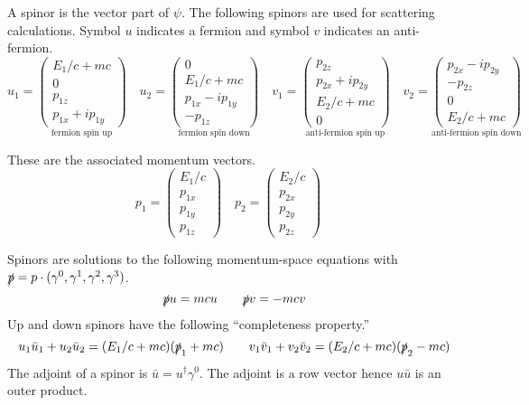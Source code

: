 \documentclass[12pt]{article}
\begin{document}
\noindent
A spinor is the vector part of $\psi$.
The following spinors are used for scattering calculations.
Symbol $u$ indicates a fermion and symbol $v$ indicates an anti-fermion.
\begin{equation*}
u_1=\underset{\text{fermion spin up}}{\begin{pmatrix}E_1/c+mc\\0\\p_{1z}\\p_{1x}+ip_{1y}\end{pmatrix}}
\quad
u_2=\underset{\text{fermion spin down}}{\begin{pmatrix}0\\E_1/c+mc\\p_{1x}-ip_{1y}\\-p_{1z}\end{pmatrix}}
\quad
v_1=\underset{\text{anti-fermion spin up}}{\begin{pmatrix}p_{2z}\\p_{2x}+ip_{2y}\\E_2/c+mc\\0\end{pmatrix}}
\quad
v_2=\underset{\text{anti-fermion spin down}}{\begin{pmatrix}p_{2x}-ip_{2y}\\-p_{2z}\\0\\E_2/c+mc\end{pmatrix}}
\end{equation*}

\noindent
These are the associated momentum vectors.
$$
p_1=\begin{pmatrix}E_1/c\\p_{1x}\\p_{1y}\\p_{1z}\end{pmatrix}\quad
p_2=\begin{pmatrix}E_2/c\\p_{2x}\\p_{2y}\\p_{2z}\end{pmatrix}\quad
$$

\noindent
Spinors are solutions to the following momentum-space equations with
$\slashed{p}=p\cdot(\gamma^0,\gamma^1,\gamma^2,\gamma^3)$.
$$
\slashed{p}u=mcu\qquad\slashed{p}v=-mcv
$$
Up and down spinors have the following ``completeness property.''
$$
u_1\bar{u}_1+u_2\bar{u}_2=(E_1/c+mc)(\slashed{p}_1+mc)\qquad
v_1\bar{v}_1+v_2\bar{v}_2=(E_2/c+mc)(\slashed{p}_2-mc)
$$
The adjoint of a spinor is $\bar{u}=u^\dag\gamma^0$.
The adjoint is a row vector hence $u\bar{u}$ is an outer product.
\end{document}
